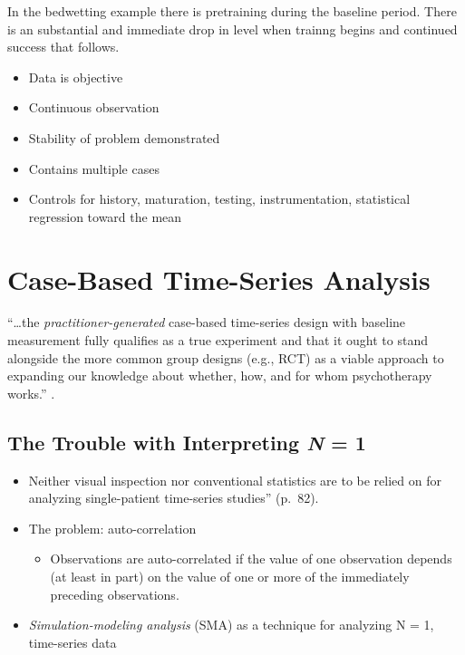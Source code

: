 \documentclass[
  english,
]{book}
\providecommand{\tightlist}{%
  \setlength{\itemsep}{0pt}\setlength{\parskip}{0pt}}
\begin{document}
In the bedwetting example there is pretraining during the baseline period. There is an substantial and immediate drop in level when trainng begins and continued success that follows.

\begin{itemize}
\tightlist
\item
  Data is objective
\item
  Continuous observation
\item
  Stability of problem demonstrated
\item
  Contains multiple cases
\item
  Controls for history, maturation, testing, instrumentation, statistical regression toward the mean
\end{itemize}

\hypertarget{case-based-time-series-analysis}{%
\section{Case-Based Time-Series Analysis}\label{case-based-time-series-analysis}}

``\ldots the \emph{practitioner-generated} case-based time-series design with baseline measurement fully qualifies as a true experiment and that it ought to stand alongside the more common group designs (e.g., RCT) as a viable approach to expanding our knowledge about whether, how, and for whom psychotherapy works.'' \citep[p.~77]{borckardt_clinical_2008}.

\hypertarget{the-trouble-with-interpreting-n-1}{%
\subsection{\texorpdfstring{The Trouble with Interpreting \emph{N} = 1}{The Trouble with Interpreting N = 1}}\label{the-trouble-with-interpreting-n-1}}

\begin{itemize}
\tightlist
\item
  Neither visual inspection nor conventional statistics are to be relied on for analyzing single-patient time-series studies'' (p.~82).
\item
  The problem: auto-correlation

  \begin{itemize}
  \tightlist
  \item
    Observations are auto-correlated if the value of one observation depends (at least in part) on the value of one or more of the immediately preceding observations.
  \end{itemize}
\item
  \emph{Simulation-modeling analysis} (SMA) as a technique for analyzing N = 1, time-series data
\end{itemize}
\end{document}
